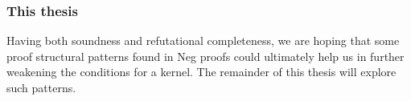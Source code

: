 \subsubsection{This thesis}
\label{subs:This thesis}
Having both soundness and refutational completeness, we are hoping that some proof structural patterns found in Neg proofs could ultimately help us in further weakening the conditions for a kernel.
The remainder of this thesis will explore such patterns.
